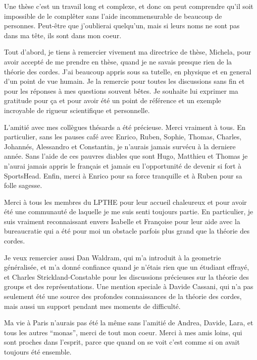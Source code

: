 \documentclass[draft]{phd}
\begin{document}
	\remerciements
			Une thèse c'est un travail long et complexe, et donc on peut comprendre qu'il soit impossible de le complêter sans l'aide incommensurable de beaucoup de personnes.
			Peut-être que j'oublierai quelqu'un, mais si leurs noms ne sont pas dans ma tête, ils sont dans mon coeur.
			
			Tout d'abord, je tiens à remercier vivement ma directrice de thèse, Michela, pour avoir accepté de me prendre en thèse, quand je ne savais presque rien de la théorie des cordes. 
			J'ai beaucoup appris sous sa tutelle, en physique et en general d'un point de vue humain. 
			Je la remercie pour toutes les discussions sans fin et pour les réponses à mes questions souvent bêtes.
			Je souhaite lui exprimer ma gratitude pour ça et pour avoir été un point de référence et un exemple incroyable de rigueur scientifique et personnelle.
			
			L'amitié avec mes collègues thésards a été précieuse. Merci vraiment à tous.
			En particulier, sans les pauses café avec Enrico, Ruben, Sophie, Thomas, Charles, Johannés, Alessandro et Constantin, je n'aurais jamais survécu à la derniere année. 
			Sans l'aide de ces pauvres diables que sont Hugo, Matthieu et Thomas je n'aurai jamais appris le français et jamais eu l'opportunité de devenir si fort à SportsHead.
			Enfin, merci à Enrico pour sa force tranquille et à Ruben pour sa folle sagesse.
			
			Merci à tous les membres du \textsc{LPTHE} pour leur accueil chaleureux et pour avoir été une communauté de laquelle je me suis senti toujours partie.
			En particulier, je suis vraiment reconnaissant envers Isabelle et Françoise pour leur aide avec la bureaucratie qui a été pour moi un obstacle parfois plus grand que la théorie des cordes.
			
			Je veux remercier aussi Dan Waldram, qui m'a introduit à la geometrie généralisée, et m'a donné confiance quand je n'étais rien que un étudiant effrayé, et Charles Strickland-Constable pour les discussions précieuses sur la théorie des groups et des représentations. 
			Une mention speciale à Davide Cassani, qui n'a pas seulement été une source des profondes connaissances de la théorie des cordes, mais aussi un support pendant mes moments de difficulté.
			
			Ma vie à Paris n'aurais pas été la même sans l'amitié de Andrea, Davide, Lara, et tous les autres ``monas'', merci de tout mon coeur.
			Merci à mes amis loins, qui sont proches dans l'esprit, parce que quand on se voit c'est comme si on avait toujours été ensemble.
			
\end{document}
